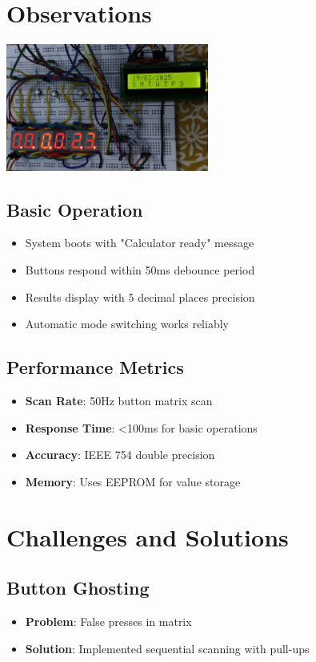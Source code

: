 \documentclass{article}
\begin{document}
\section{Observations}
\begin{center}
        \includegraphics[width=0.5\textwidth]{figs/1.jpg}
    \end{center}
\subsection{Basic Operation}
\begin{itemize}
    \item System boots with "Calculator ready" message
    \item Buttons respond within 50ms debounce period
    \item Results display with 5 decimal places precision
    \item Automatic mode switching works reliably
\end{itemize}

\subsection{Performance Metrics}
\begin{itemize}
    \item \textbf{Scan Rate}: 50Hz button matrix scan
    \item \textbf{Response Time}: <100ms for basic operations
    \item \textbf{Accuracy}: IEEE 754 double precision
    \item \textbf{Memory}: Uses EEPROM for value storage
\end{itemize}

\section{Challenges and Solutions}

\subsection{Button Ghosting}
\begin{itemize}
    \item \textbf{Problem}: False presses in matrix
    \item \textbf{Solution}: Implemented sequential scanning with pull-ups
\end{itemize}
\end{document}
